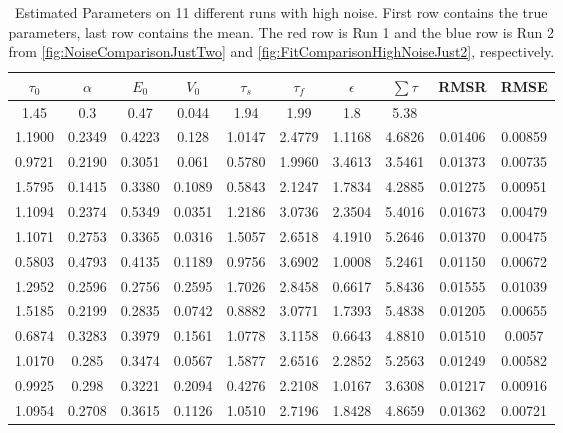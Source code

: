 \begin{table}[t]
\centering
\begin{tabular}{|c | c | c | c | c | c | c | c | c | c |}
\hline
$\tau_0$ & $\alpha$ & $E_0$    & $V_0$    & $\tau_s$ & $\tau_f$ & $\epsilon$  & $ \sum \tau $ & \acs{RMSR} & \acs{RMSE} \\
\hline
\rowcolor[gray]{.8}
1.45 & 0.3 & 0.47 & 0.044 & 1.94 & 1.99 & 1.8  & 5.38 &  & \\
\hline
\hline
1.1900 & 0.2349 & 0.4223 & 0.128  & 1.0147 & 2.4779 & 1.1168 & 4.6826 &0.01406 & 0.00859\\
0.9721 & 0.2190 & 0.3051 & 0.061  & 0.5780 & 1.9960 & 3.4613 & 3.5461 &0.01373 & 0.00735\\
1.5795 & 0.1415 & 0.3380 & 0.1089 & 0.5843 & 2.1247 & 1.7834 & 4.2885 &0.01275 & 0.00951\\
1.1094 & 0.2374 & 0.5349 & 0.0351 & 1.2186 & 3.0736 & 2.3504 & 5.4016 &0.01673 & 0.00479 \\
1.1071 & 0.2753 & 0.3365 & 0.0316 & 1.5057 & 2.6518 & 4.1910 & 5.2646 &0.01370 & 0.00475\\
0.5803 & 0.4793 & 0.4135 & 0.1189 & 0.9756 & 3.6902 & 1.0008 & 5.2461 &0.01150 & 0.00672\\
\rowcolor[rgb]{.9,.5,.5}
1.2952 & 0.2596 & 0.2756 & 0.2595 & 1.7026 & 2.8458 & 0.6617 & 5.8436 &0.01555 & 0.01039\\
\rowcolor[rgb]{.5,.5,.9}
1.5185 & 0.2199 & 0.2835 & 0.0742 & 0.8882 & 3.0771 & 1.7393 & 5.4838 &0.01205 & 0.00655\\
0.6874 & 0.3283 & 0.3979 & 0.1561 & 1.0778 & 3.1158 & 0.6643 & 4.8810 &0.01510 & 0.0057 \\
1.0170 & 0.285  & 0.3474 & 0.0567 & 1.5877 & 2.6516 & 2.2852 & 5.2563 &0.01249 & 0.00582\\
0.9925 & 0.298  & 0.3221 & 0.2094 & 0.4276 & 2.2108 & 1.0167 & 3.6308 &0.01217 & 0.00916\\
\hline
1.0954 & 0.2708 & 0.3615 & 0.1126 & 1.0510 & 2.7196 & 1.8428 & 4.8659 &0.01362 & 0.00721\\
\hline
\end{tabular}
\caption[Estimated Parameters on 11 different runs with high noise. First row contains the true parameters,
last row contains the mean.]
{Estimated Parameters on 11 different runs with high noise. First row contains the true parameters,
last row contains the mean.
The red row is Run 1 and the blue row is Run 2 from  \autoref{fig:NoiseComparisonJustTwo}
and \autoref{fig:FitComparisonHighNoiseJust2}, respectively.}
\label{tab:HighNoiseResults}
\end{table}

